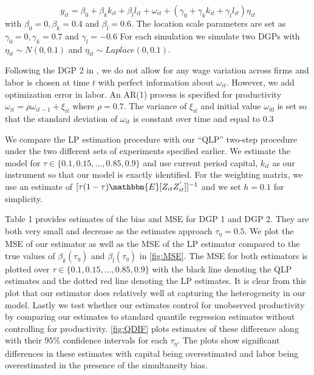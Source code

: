 \documentclass[11pt]{article}
\begin{document}
\begin{equation}
y_{it}=\beta_{0}+\beta_{k}k_{it}+\beta_{l}l_{it}+\omega_{it}+(\gamma_{0}+\gamma_{k}k_{it}+\gamma_{l}l_{it})\eta_{it}
\end{equation}
with $\beta_{0}=0, \beta_{k}=0.4$ and $\beta_{l}=0.6$. The location scale parameters are set as $\gamma_{0}=0, \gamma_{k}=0.7$ and $\gamma_{l}=-0.6$ For each simulation we simulate two DGPs with $\eta_{it}\sim N(0,0.1)$ and $\eta_{it}\sim Laplace(0,0.1)$.

Following the DGP 2 in \cite{Ackerberg2015}, we do not allow for any wage variation across firms and labor is chosen at time $t$ with perfect information about $\omega_{it}$. However, we add optimization error in labor. An AR(1) process is specified for productivity $\omega_{it}=\rho\omega_{it-1}+\xi_{it}$ where $\rho=0.7$. The variance of $\xi_{it}$ and initial value $\omega_{i0}$ is set so that the standard deviation of $\omega_{it}$ is constant over time and equal to $0.3$

We compare the LP estimation procedure with our ``QLP'' two-step procedure under the two different sets of experiments specified earlier. We estimate the model for $\tau\in\{0.1, 0.15, \dots, 0.85, 0.9\}$ and use current period capital, $k_{it}$ as our instrument so that our model is exactly identified. For the weighting matrix, we use an estimate of $[\tau(1-\tau)\mathbbm{E}[Z_{it}Z^{'}_{it}]]^{-1}$ and we set $h=0.1$ for simplicity.

Table 1 provides estimates of the bias and MSE for DGP 1 and DGP 2. They are both very small and decrease as the estimates approach $\tau_{\eta}=0.5$. We plot the MSE of our estimator as well as the MSE of the LP estimator compared to the true values of $\beta_{k}(\tau_{\eta})$ and $\beta_{l}(\tau_{\eta})$ in \ref{fig:MSE}. The MSE for both estimators is plotted over $\tau\in\{0.1, 0.15, \dots, 0.85, 0.9\}$ with the black line denoting the QLP estimates and the dotted red line denoting the LP estimates. It is clear from this plot that our estimator does relatively well at capturing the heterogeneity in our model. Lastly we test whether our estimates control for unobserved productivity by comparing our estimates to standard quantile regression estimates without controlling for productivity. \ref{fig:QDIF} plots estimates of these difference along with their $95\%$ confidence intervals for each $\tau_{\eta}$. The plots show significant differences in these estimates with capital being overestimated and labor being overestimated in the presence of the simultaneity bias.
\end{document}
